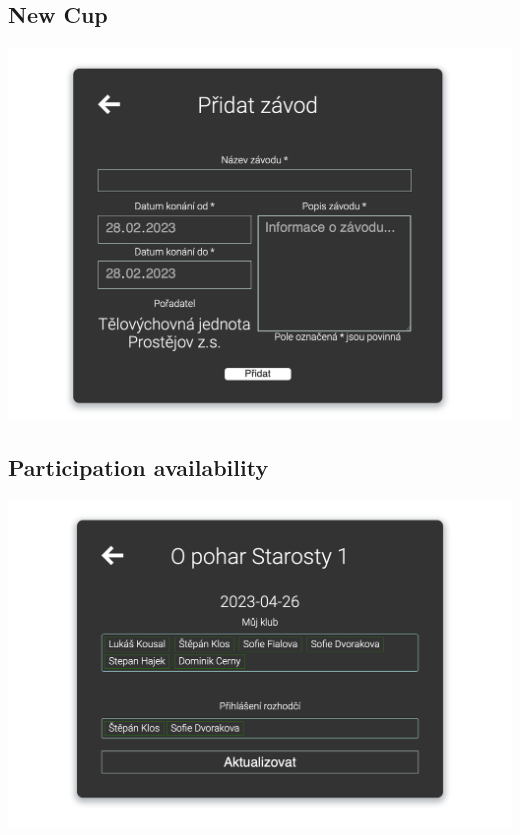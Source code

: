 \subsection*{New Cup}
\includegraphics[scale=0.430]{img/admin_new_cup.png}
\subsection*{Participation availability}
\includegraphics[scale=0.430]{img/admin_avail.png}

